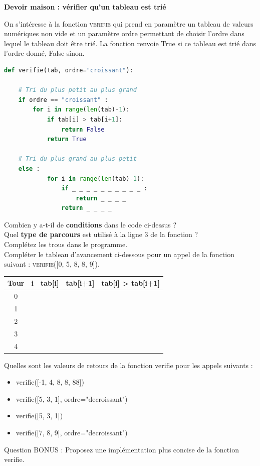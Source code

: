 \begin{center}
    \textbf{\LARGE{Devoir maison : vérifier qu'un tableau est trié}}\\
\end{center}


On s'intéresse à la fonction \textsc{verifie} qui prend en paramètre un tableau de valeurs numériques non vide et un paramètre ordre permettant de choisir l'ordre dans lequel le tableau doit être trié. La fonction renvoie True si ce tableau est trié dans l’ordre donné, False sinon.

\begin{lstlisting}[language=Python]
def verifie(tab, ordre="croissant"):

    # Tri du plus petit au plus grand
    if ordre == "croissant" :
        for i in range(len(tab)-1):
            if tab[i] > tab[i+1]:
                return False
            return True
    
    # Tri du plus grand au plus petit    
    else : 
            for i in range(len(tab)-1):
                if _ _ _ _ _ _ _ _ _ _ :
                    return _ _ _ _ 
                return _ _ _ _ 
\end{lstlisting}

\begin{Exercise}[title={Vérification tri}]
\Question Combien y a-t-il de \textbf{conditions} dans le code ci-dessus ?\\
\emptybox{1cm}
\Question Quel \textbf{type de parcours} est utilisé à la ligne 3 de la fonction ?\\
\emptybox{1cm}
\Question Complétez les trous dans le programme.\\
\Question Compléter le tableau d'avancement ci-dessous pour un appel de la fonction suivant : \textsc{verifie([0, 5, 8, 8, 9])}.\\
\begin{center}
\large
\begin{tabular}{c|c|c|c|c|}
\textbf{Tour} & \textbf{i} & \textbf{tab[i]} & \textbf{tab[i+1]} & \textbf{tab[i] > tab[i+1]}  \\
\hline
0 &  &  &  & \\
1 &  &  &  & \\
2 &  &  &  & \\
3 &  &  &  & \\
4 &  &  &  & \\
\end{tabular}
\end{center}

\Question Quelles sont les valeurs de retours de la fonction verifie pour les appels suivants :
\begin{itemize}
 \item verifie([-1, 4, 8, 8, 88])
 \item verifie([5, 3, 1], ordre="decroissant")
 \item verifie([5, 3, 1])
 \item verifie([7, 8, 9], ordre="decroissant")
\end{itemize}


\Question Question BONUS : Proposez une implémentation plus concise de la fonction verifie.
\end{Exercise}